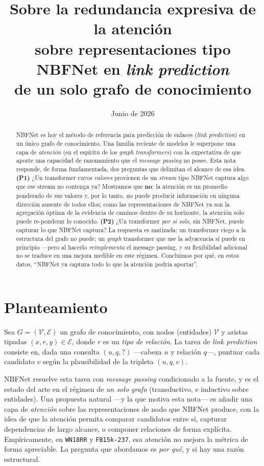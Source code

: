 \documentclass[11pt]{article}
\title{\textbf{Sobre la redundancia expresiva de la atención\\
sobre representaciones tipo NBFNet en \emph{link prediction}\\ de un solo grafo de conocimiento}}
\author{}
\date{Junio de 2026}
\theoremstyle{plain}
\theoremstyle{definition}
\begin{document}
\maketitle

\begin{abstract}
NBFNet es hoy el método de referencia para predicción de enlaces (\emph{link prediction})
en un único grafo de conocimiento. Una familia reciente de modelos le superpone una capa de
\emph{atención} (en el espíritu de los \emph{graph transformers}) con la expectativa de que aporte
una capacidad de razonamiento que el \emph{message passing} no posee. Esta nota responde, de forma
fundamentada, dos preguntas que delimitan el alcance de esa idea. \textbf{(P1)} ¿Un transformer cuyos
\emph{valores} provienen de un \emph{stream} tipo NBFNet captura algo que ese stream no contenga ya?
Mostramos que \textbf{no}: la atención es un promedio ponderado de sus valores y, por lo tanto, no
puede producir información en ninguna dirección ausente de todos ellos; como las representaciones de
NBFNet ya son la agregación óptima de la evidencia de caminos dentro de su horizonte, la atención solo
puede re-ponderar lo conocido. \textbf{(P2)} ¿Un transformer \emph{por sí solo}, sin NBFNet, puede
capturar lo que NBFNet captura? La respuesta es matizada: un transformer ciego a la estructura del
grafo no puede; un \emph{graph} transformer que use la adyacencia sí puede en principio ---pero al
hacerlo \emph{reimplementa} el message passing, y su flexibilidad adicional no se traduce en una
mejora medible en este régimen. Concluimos por qué, en estos datos, ``NBFNet ya captura todo lo que la
atención podría aportar''.
\end{abstract}

\section{Planteamiento}

Sea $G=(\mathcal{V},\mathcal{E})$ un grafo de conocimiento, con nodos (entidades) $\mathcal{V}$ y
aristas tipadas $(x,r,y)\in\mathcal{E}$, donde $r$ es un \emph{tipo de relación}. La tarea de
\emph{link prediction} consiste en, dada una consulta $(u,q,?)$ ---cabeza $u$ y relación $q$---,
puntuar cada candidato $v$ según la plausibilidad de la tripleta $(u,q,v)$.

NBFNet \cite{nbfnet} resuelve esta tarea con \emph{message passing} condicionado a la fuente, y es el
estado del arte en el régimen de \emph{un solo grafo} (transductivo, e inductivo sobre entidades).
Una propuesta natural ---y la que motiva esta nota--- es añadir una capa de \emph{atención} sobre las
representaciones de nodo que NBFNet produce, con la idea de que la atención permita comparar
candidatos entre sí, capturar dependencias de largo alcance, o componer relaciones de forma explícita.
Empíricamente, en \texttt{WN18RR} y \texttt{FB15k-237}, esa atención no mejora la métrica de forma
apreciable. La pregunta que abordamos es \emph{por qué}, y si hay una razón estructural.
\end{document}
